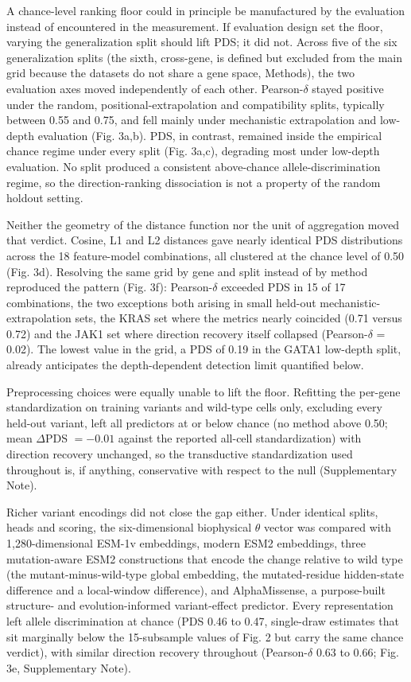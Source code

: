 \documentclass[11pt,letterpaper]{article}
\begin{document}
A chance-level ranking floor could in principle be manufactured by the evaluation instead of encountered in the measurement. If evaluation design set the floor, varying the generalization split should lift PDS; it did not. Across five of the six generalization splits (the sixth, cross-gene, is defined but excluded from the main grid because the datasets do not share a gene space, Methods), the two evaluation axes moved independently of each other. Pearson-$\delta$ stayed positive under the random, positional-extrapolation and compatibility splits, typically between 0.55 and 0.75, and fell mainly under mechanistic extrapolation and low-depth evaluation (Fig. 3a,b). PDS, in contrast, remained inside the empirical chance regime under every split (Fig. 3a,c), degrading most under low-depth evaluation. No split produced a consistent above-chance allele-discrimination regime, so the direction-ranking dissociation is not a property of the random holdout setting.

Neither the geometry of the distance function nor the unit of aggregation moved that verdict. Cosine, L1 and L2 distances gave nearly identical PDS distributions across the 18 feature-model combinations, all clustered at the chance level of 0.50 (Fig. 3d). Resolving the same grid by gene and split instead of by method reproduced the pattern (Fig. 3f): Pearson-$\delta$ exceeded PDS in 15 of 17 combinations, the two exceptions both arising in small held-out mechanistic-extrapolation sets, the KRAS set where the metrics nearly coincided (0.71 versus 0.72) and the JAK1 set where direction recovery itself collapsed (Pearson-$\delta$ = 0.02). The lowest value in the grid, a PDS of 0.19 in the GATA1 low-depth split, already anticipates the depth-dependent detection limit quantified below.

Preprocessing choices were equally unable to lift the floor. Refitting the per-gene standardization on training variants and wild-type cells only, excluding every held-out variant, left all predictors at or below chance (no method above 0.50; mean $\Delta$PDS $=-0.01$ against the reported all-cell standardization) with direction recovery unchanged, so the transductive standardization used throughout is, if anything, conservative with respect to the null (Supplementary Note).

Richer variant encodings did not close the gap either. Under identical splits, heads and scoring, the six-dimensional biophysical $\theta$ vector was compared with 1,280-dimensional ESM-1v embeddings, modern ESM2 embeddings\cite{ESM2}, three mutation-aware ESM2 constructions that encode the change relative to wild type (the mutant-minus-wild-type global embedding, the mutated-residue hidden-state difference and a local-window difference), and AlphaMissense\cite{AlphaMissense}, a purpose-built structure- and evolution-informed variant-effect predictor. Every representation left allele discrimination at chance (PDS 0.46 to 0.47, single-draw estimates that sit marginally below the 15-subsample values of Fig. 2 but carry the same chance verdict), with similar direction recovery throughout (Pearson-$\delta$ 0.63 to 0.66; Fig. 3e, Supplementary Note).
\end{document}
